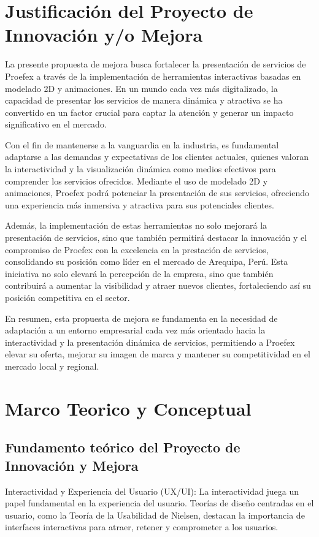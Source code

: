 \section{Justificación del Proyecto de Innovación y/o Mejora}
La presente propuesta de mejora busca fortalecer la presentación de servicios de Proefex a
través de la implementación de herramientas interactivas basadas en modelado 2D y
animaciones. En un mundo cada vez más digitalizado, la capacidad de presentar los
servicios de manera dinámica y atractiva se ha convertido en un factor crucial para
captar la atención y generar un impacto significativo en el mercado. 

Con el fin de mantenerse a la vanguardia en la industria, es fundamental adaptarse a las
demandas y expectativas de los clientes actuales, quienes valoran la interactividad y la
visualización dinámica como medios efectivos para comprender los servicios ofrecidos.
Mediante el uso de modelado 2D y animaciones, Proefex podrá potenciar la presentación de
sus servicios, ofreciendo una experiencia más inmersiva y atractiva para sus potenciales
clientes.

Además, la implementación de estas herramientas no solo mejorará la presentación de
servicios, sino que también permitirá destacar la innovación y el compromiso de Proefex
con la excelencia en la prestación de servicios, consolidando su posición como líder en
el mercado de Arequipa, Perú. Esta iniciativa no solo elevará la percepción de la
empresa, sino que también contribuirá a aumentar la visibilidad y atraer nuevos
clientes, fortaleciendo así su posición competitiva en el sector. 

En resumen, esta propuesta de mejora se fundamenta en la necesidad de adaptación a un
entorno empresarial cada vez más orientado hacia la interactividad y la presentación
dinámica de servicios, permitiendo a Proefex elevar su oferta, mejorar su imagen de
marca y mantener su competitividad en el mercado local y regional.

\section{Marco Teorico y Conceptual}

\subsection{Fundamento teórico del Proyecto de Innovación y Mejora}

 Interactividad y Experiencia del Usuario (UX/UI): La interactividad juega un papel
fundamental en la experiencia del usuario. Teorías de diseño centradas en el usuario,
como la Teoría de la Usabilidad de Nielsen, destacan la importancia de interfaces
interactivas para atraer, retener y comprometer a los usuarios.


